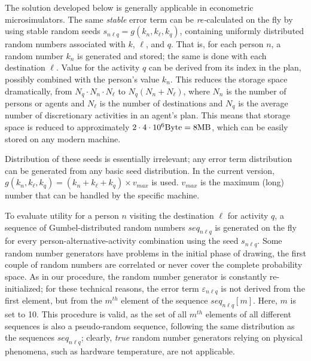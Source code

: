 The solution developed below is generally applicable in econometric microsimulators. The same \emph{stable} error term can be \emph{re-}calculated on the fly by using stable random seeds $s_{n\ell q} = g(k_n, k_\ell, k_q)$, containing uniformly distributed random numbers associated with $k$, $\ell$, and $q$. 
That is, for each person $n$, a random number $k_n$ is generated and stored; the same is done with each destination $\ell$. 
Value for the activity $q$ can be derived from its index in the plan, possibly combined with the person's value $k_n$. 
This reduces the storage space dramatically, from $N_q \cdot N_n \cdot N_{\ell}$ to $N_q (N_n + N_{\ell})$, where $N_n$ is the number of persons or agents and $N_{\ell}$ is the number of destinations and $N_q$ is the average number of discretionary activities in an agent's plan.  
This means that storage space is reduced to approximately $2 \cdot 4 \cdot 10^{6} \hbox{Byte} = 8 \hbox{MB}$, which can be easily stored 
on any modern machine.

Distribution of these seeds is essentially irrelevant; any error term distribution can be generated from any basic seed distribution. 
In the current version, $g(k_n, k_\ell, k_q) = (k_n + k_\ell + k_q) \times v_{max}$ is used. $v_{max}$ is the maximum (long) number that can be handled by the specific machine.

To evaluate utility for a person $n$ visiting the destination $\ell$ for activity $q$, a sequence of Gumbel-distributed random numbers $seq_{n\ell q}$ is generated on the fly for every person-alternative-activity combination using the seed $s_{n\ell q}$. 
Some random number generators have problems in the initial phase of drawing, \eg the first couple of random numbers are correlated or never cover the complete probability space. As in our procedure, the random number generator is constantly re-initialized; for these technical reasons, the error term $\varepsilon_{n\ell q}$ is not derived from the first element, but from the $m^{th}$ element of the sequence $seq_{n\ell q}[m]$. 
Here, $m$ is set to 10. 
This procedure is valid, as the set of all  $m^{th}$ elements of all different sequences is also a pseudo-random sequence, following the same distribution as the sequences $seq_{n\ell q}$; clearly, \emph{true} random number generators relying on physical phenomena, such as hardware temperature, are not applicable. 

